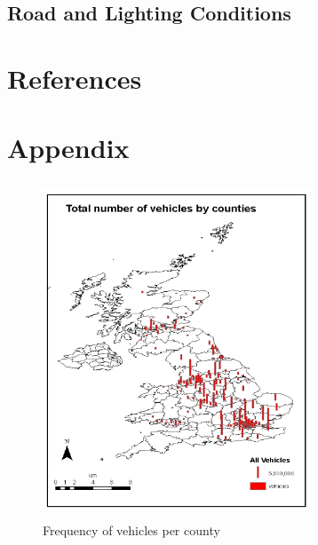 \documentclass{neu_handout}
\begin{document}
\subsection{Road and Lighting Conditions}

  
\section{References}

\pagebreak
\section{Appendix}
\begin{figure}[!htb]
  \includegraphics[width=8cm, height=10cm]{vehicles-by-county.png}
  \caption{Frequency of vehicles per county}
\end{figure}
\end{document}
